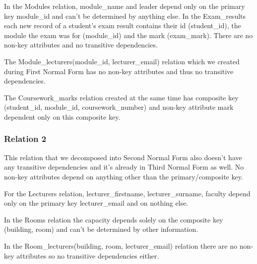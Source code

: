 In the Modules relation, module_name and leader depend only on the primary key module_id and can’t be determined by anything else.
In the Exam_results each new record of a student’s exam result contains  their id (student_id), the module the exam was for (module_id) and the mark (exam_mark). There are no non-key attributes and no transitive dependencies.

The Module_lecturers(module_id, lecturer_email) relation which we created during First Normal Form has no non-key attributes and thus no transitive dependencies.

The Coursework_marks relation created at the same time has composite key (student_id, module_id, coursework_number) and non-key attribute mark dependent only on this composite key.

\subsubsection*{Relation 2}
This relation that we decomposed into Second Normal Form also doesn’t have any transitive dependencies and it’s already in Third Normal Form as well. No non-key attributes depend on anything other than the primary/composite key.

For the Lecturers relation, lecturer_firstname, lecturer_surname, faculty depend only on the primary key lecturer_email and on nothing else.

In the Rooms relation the capacity depends solely on the composite key (building, room) and can’t be determined by other information.

In the Room_lecturers(building, room, lecturer_email) relation there are no non-key attributes so no transitive dependencies either.